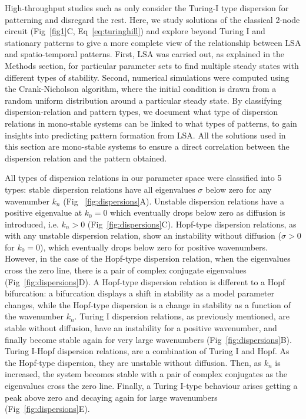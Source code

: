 \documentclass[10pt,letterpaper]{article}
\begin{document}
High-throughput studies such as \cite{Scholes2019, Zheng2016, Marcon} only consider the Turing-I type dispersion for patterning and disregard the rest.
Here, we study solutions of the classical 2-node circuit (Fig~\ref{fig1}C, Eq~\ref{eq:turinghill}) and explore beyond Turing I and stationary patterns to give a more complete view of the relationship between LSA and spatio-temporal patterns. 
First, LSA was carried out, as explained in the Methods section, for particular parameter sets to find multiple steady states with different types of stability. 
Second, numerical simulations were computed using the Crank-Nicholson algorithm, where the initial condition is drawn from a random uniform distribution around a particular steady state. By classifying dispersion-relation and pattern types, we document what type of dispersion relations in mono-stable systems can be linked to what types of patterns, to gain insights into predicting pattern formation from LSA. All the solutions used in this section are mono-stable systems to ensure a direct correlation between the dispersion relation and the pattern obtained.

All types of dispersion relations in our parameter space were classified into 5 types: stable dispersion relations have all eigenvalues $\sigma$ below zero for any wavenumber $k_{n}$ (Fig ~\ref{fig:dispersions}A). Unstable dispersion relations have a positive eigenvalue at $k_{0}=0$ which eventually drops below zero as diffusion is introduced, i.e. $k_{n}>0$ (Fig~\ref{fig:dispersions}C). Hopf-type dispersion relations, as with any unstable dispersion relation, show an instability without diffusion ($\sigma>0$ for $k_{0}=0$), which eventually drops below zero for positive wavenumbers. However, in the case of the Hopf-type dispersion relation, when the eigenvalues cross the zero line, there is a pair of complex conjugate eigenvalues (Fig~\ref{fig:dispersions}D).
A Hopf-type dispersion relation is different to a Hopf bifurcation: a bifurcation displays a shift in stability as a model parameter changes, while the Hopf-type dispersion is a change in stability as a function of the wavenumber $k_{n}$.
Turing I dispersion relations, as previously mentioned, are stable without diffusion, have an instability for a positive wavenumber, and finally become stable again for very large wavenumbers (Fig~\ref{fig:dispersions}B).
Turing I-Hopf dispersion relations, are a combination of Turing I and Hopf. As the Hopf-type dispersion, they are unstable without diffusion. Then, as $k_{n}$ is increased, the system becomes stable with a pair of complex conjugates as the eigenvalues cross the zero line.
Finally, a Turing I-type behaviour arises getting a peak above zero and decaying again for large wavenumbers (Fig~\ref{fig:dispersions}E).
\end{document}
